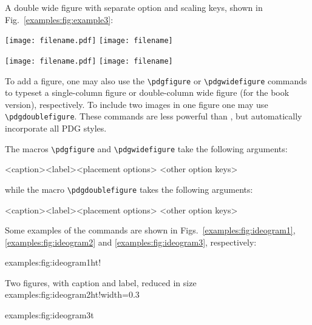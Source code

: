 A double wide figure with separate option and scaling keys, shown in Fig.~\ref{examples:fig:example3}:
\begin{verbtex}
\begin{pdgxfigure}[wide=true,place=h,width = 0.3\linewidth] 
	\texttt{[image: filename.pdf]}\hspace{1cm}
	\texttt{[image: filename]}
	\caption{Example double figure, 
		with separate option and scaling keys, in both book and web versions}
	\label{examples:fig:example3}
\end{pdgxfigure}
\end{verbtex}
\begin{pdgxfigure}[wide=true,place=h,width = 0.3\linewidth] 
	\texttt{[image: filename.pdf]}\hspace{1cm}
	\texttt{[image: filename]}
	\caption{Example double wide figure, with separate option and scaling keys, in both book and web versions}
	\label{examples:fig:example3}
\end{pdgxfigure}

To add a figure, one may also use the \lstinline{\pdgfigure} or \lstinline{\pdgwidefigure} commands 
to typeset a single-column figure or double-column wide figure (for the book version), respectively. 
To include two images in one figure one may use \lstinline{\pdgdoublefigure}.
These commands are less powerful than , but automatically incorporate all PDG styles.

The macros \lstinline{\pdgfigure} and \lstinline{\pdgwidefigure} take the following arguments:
\begin{verbtex}
	{<caption>}{<label>}{<placement options>}
	{<other option keys>}
\end{verbtex}
\vspace{-10pt}
while the macro \lstinline{\pdgdoublefigure} takes the following arguments:
\begin{verbtex}
	{<caption>}{<label>}{<placement options>}
	{<other option keys>}
\end{verbtex}
Some examples of the  commands are shown in Figs.~\ref{examples:fig:ideogram1}, \ref{examples:fig:ideogram2} and \ref{examples:fig:ideogram3}, respectively:
\begin{verbtex}
	{examples:fig:ideogram1}{ht!}{}
	
	{Two figures, with caption and label, reduced in size}
	{examples:fig:ideogram2}{ht!}{width=0.3\textwidth}
	
	{examples:fig:ideogram3}{t}{}
\end{verbtex}
\FloatBarrier
{}
\FloatBarrier


